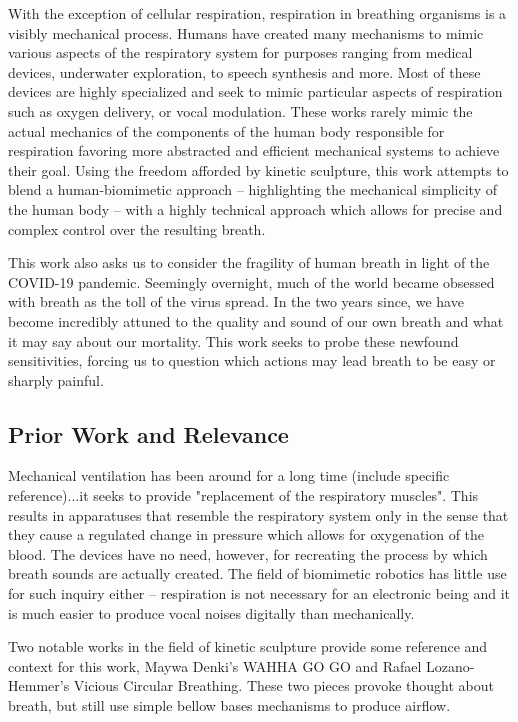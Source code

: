 \documentclass[letterpaper]{article}
\begin{document}
With the exception of cellular respiration, respiration in breathing organisms is a visibly mechanical process. Humans have created many mechanisms to mimic various aspects of the respiratory system for purposes ranging from medical devices, underwater exploration, to speech synthesis and more. Most of these devices are highly specialized and seek to mimic particular aspects of respiration such as oxygen delivery, or vocal modulation. These works rarely mimic the actual mechanics of the components of the human body responsible for respiration favoring more abstracted and efficient mechanical systems to achieve their goal. Using the freedom afforded by kinetic sculpture, this work attempts to blend a human-biomimetic approach -- highlighting the mechanical simplicity of the human body -- with a highly technical approach which allows for precise and complex control over the resulting breath.    

This work also asks us to consider the fragility of human breath in light of the COVID-19 pandemic. Seemingly overnight, much of the world became obsessed with breath as the toll of the virus spread. In the two years since, we have become incredibly attuned to the quality and sound of our own breath and what it may say about our mortality. This work seeks to probe these newfound sensitivities, forcing us to question which actions may lead breath to be easy or sharply painful. 




\subsection{Prior Work and Relevance}
Mechanical ventilation has been around for a long time (include specific reference)...it  seeks to provide "replacement of the respiratory muscles". \cite{ventilatorhistory} This results in apparatuses that resemble the respiratory system only in the sense that they cause a regulated change in pressure which allows for oxygenation of the blood. The devices have no need, however, for recreating the process by which breath sounds are actually created. The field of biomimetic robotics has little use for such inquiry either -- respiration is not necessary for an electronic being and it is much easier to produce vocal noises digitally than mechanically. 

Two notable works in the field of kinetic sculpture provide some reference and context for this work, Maywa Denki's WAHHA GO GO and Rafael Lozano-Hemmer's Vicious Circular Breathing. \cite{denki} \cite{lozanohemmer} These two pieces provoke thought about breath, but still use simple bellow bases mechanisms to produce airflow. 
\end{document}
